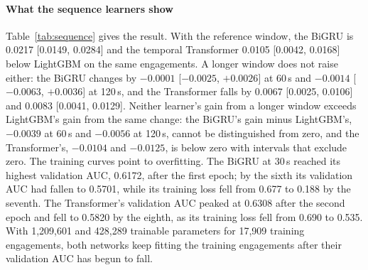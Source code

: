 \paragraph{What the sequence learners show}
Table~\ref{tab:sequence} gives the result. With the reference window, the BiGRU is 0.0217 [0.0149, 0.0284]
and the temporal Transformer 0.0105 [0.0042, 0.0168] below LightGBM on the same engagements. A longer window
does not raise either: the BiGRU changes by $-0.0001$ [$-0.0025$, $+0.0026$] at 60\,s and $-0.0014$
[$-0.0063$, $+0.0036$] at 120\,s, and the Transformer falls by 0.0067 [0.0025, 0.0106] and 0.0083 [0.0041,
0.0129]. Neither learner's gain from a longer window exceeds LightGBM's gain from the same change: the
BiGRU's gain minus LightGBM's, $-0.0039$ at 60\,s and $-0.0056$ at 120\,s, cannot be distinguished from
zero, and the Transformer's, $-0.0104$ and $-0.0125$, is below zero with intervals that exclude zero. The
training curves point to overfitting. The BiGRU at 30\,s reached its highest validation AUC, 0.6172, after
the first epoch; by the sixth its validation AUC had fallen to 0.5701, while its training loss fell from
0.677 to 0.188 by the seventh. The Transformer's validation AUC peaked at 0.6308 after the second epoch and
fell to 0.5820 by the eighth, as its training loss fell from 0.690 to 0.535. With 1,209,601 and 428,289
trainable parameters for 17,909 training engagements, both networks keep fitting the training engagements
after their validation AUC has begun to fall.

